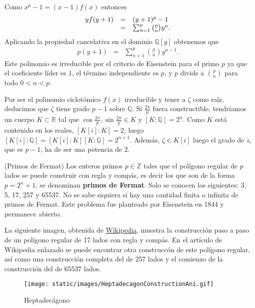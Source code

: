 Como \(x^p-1=(x-1)f(x)\) entonces \[\begin{array}{rcl}
yf(y+1)&=&(y+1)^p-1\cr
&=& \sum_{n=1}^{p}\binom{p}{n}y^n.
\end{array}\] Aplicando la propiedad cancelativa en el dominio
\(\mathbb Q[y]\) obtenemos que \[\begin{array}{rcl}
p(y+1)&=&\sum_{n=1}^{p}\binom{p}{n}y^{n-1}.
\end{array}\] Este polinomio es irreducible por el criterio de
Eisenstein para el primo \(p\) ya que el coeficiente líder es \(1\), el
término independiente es \(p\), y \(p\) divide a \(\binom{p}{n}\) para
todo \(0{<}n{<}p\).

Por ser el polinomio ciclotómico \(f(x)\) irreducible y tener a
\(\zeta\) como raíz, deducimos que \(\zeta\) tiene grado \(p-1\) sobre
\(\mathbb Q\). Si \(\frac{2\pi}{p}\) fuera constructible, tendríamos un
cuerpo \(K\subset\mathbb R\) tal que
\(\cos\frac{2\pi}{p}, \sin\frac{2\pi}{p}\in K\) y \([K:\mathbb Q]=2^n\).
Como \(K\) está contenido en los reales, \([K[i]:K]=2\), luego
\([K[i]:\mathbb Q]=[K[i]:K][K:\mathbb Q]=2^{n+1}\). Además,
\(\zeta\in K[i]\) luego el grado de \(z\), que es \(p-1\), ha de ser una
potencia de \(2\). 

\textrm{\normalfont (Primos de Fermat)} Los enteros
primos \(p\in\mathbb Z\) tales que el polígono regular de \(p\) lados se
puede construir con regla y compás, es decir los que son de la forma
\(p=2^n+1\), se denominan \textbf{primos de Fermat}. Solo se conocen los
siguientes: 3, 5, 17, 257 y 65537. No se sabe siquiera si hay una
cantidad finita o infinita de primos de Fermat. Este problema fue
planteado por Eisenstein en 1844 y permanece abierto.

La siguiente imagen, obtenida de
\href{https://en.wikipedia.org/wiki/Constructible_polygon}{Wikipedia},
muestra la construcción paso a paso de un polígono regular de 17 lados
con regla y compás. En el artículo de Wikipedia enlazado se puede
encontrar otra construccón de este polígono regular, así como una
construcción completa del de 257 lados y el comienzo de la construcción
del de 65537 lados.

\begin{figure}
\centering
\texttt{[image: static/images/HeptadecagonConstructionAni.gif]}
\caption{Heptadecágono}
\end{figure}

